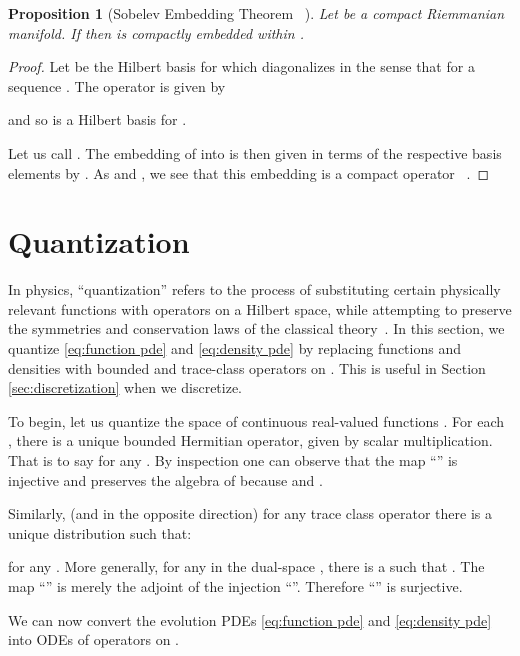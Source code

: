 \documentclass[final,leqno]{amsart}
\newtheorem{proposition}[theorem]{Proposition}
\begin{document}
\begin{proposition}[Sobelev Embedding Theorem ~\cite{Taylor1974}] \label{prop:compact_embedding}
	Let  be a compact Riemmanian manifold.  If  then  is compactly embedded within .
\end{proposition}
\begin{proof}
Let  be the Hilbert basis for  which diagonalizes 
	in the sense that  for a sequence .
	The operator  is given by
	
	and so  is a Hilbert basis for .
	
	Let us call .
	The embedding of  into 
	is then given in terms of the respective basis elements by .
	As  and , we see that 
	this embedding is a compact operator ~\cite[Proposition 4.6]{Conway1990}.
\end{proof}




\section{Quantization} \label{sec:quantization}
In physics, ``quantization'' refers to the process of substituting certain physically relevant functions with operators on a Hilbert space, while attempting to preserve the symmetries and conservation laws of the classical theory~\cite{BatesWeinstein1997,Dirac2013,GuilleminSternberg1970}.
In this section, we quantize \eqref{eq:function pde} and \eqref{eq:density pde} by replacing functions and densities with bounded and trace-class operators on .
This is useful in Section \ref{sec:discretization} when we discretize.

To begin, let us quantize the space of continuous real-valued functions .
For each , there is a unique bounded Hermitian operator,  given by scalar multiplication.
That is to say  for any .
By inspection one can observe that the map ``'' is injective and preserves the algebra of  because  and .

Similarly, (and in the opposite direction) for any trace class operator  there is a unique distribution  such that: 

for any .
More generally, for any  in the dual-space , there is a  such that .
The map ``'' is merely the adjoint of the injection ``''. Therefore ``'' is surjective.






We can now convert the evolution PDEs \eqref{eq:function pde} and \eqref{eq:density pde} into ODEs of operators on .
\end{document}
